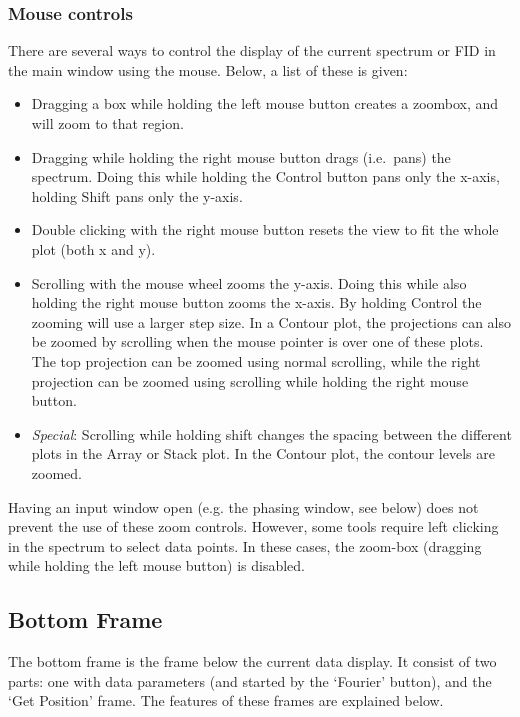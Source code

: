 \documentclass[11pt,a4paper]{article}
\begin{document}
\subsubsection{Mouse controls}
There are several ways to control the display of the current spectrum or FID in the main window
using the mouse. Below, a list of these is given:

\begin{itemize}
\item Dragging a box while holding the left mouse button creates a zoombox, and will zoom to that region.
\item Dragging while holding the right mouse button drags (i.e.\ pans) the spectrum. Doing this while holding the Control button pans only the x-axis, holding Shift pans only the y-axis.
\item Double clicking with the right mouse button resets the view to fit the whole plot (both x and y).
\item Scrolling with the mouse wheel zooms the y-axis. Doing this while also holding the right mouse button zooms the x-axis. By holding Control the zooming will use a larger step size. In a Contour plot, the projections can also be zoomed by scrolling when the mouse pointer is over one of these plots. The top projection can be zoomed using normal scrolling, while the right projection can be zoomed using scrolling while holding the right mouse button.
\item \textit{Special}: Scrolling while holding shift changes the spacing between the different plots in the Array or Stack plot. In the Contour plot, the contour levels are zoomed.
\end{itemize}

Having an input window open (e.g. the phasing window, see below) does not prevent the use of these zoom controls. However, some tools require left clicking in the spectrum to select data points. In these cases, the zoom-box (dragging while holding the left mouse button) is disabled.

\subsection{Bottom Frame}
The bottom frame is the frame below the current data display. It consist of two parts: one with data parameters (and started by the `Fourier' button), and the `Get Position' frame. The features of these frames are explained below.
\end{document}
